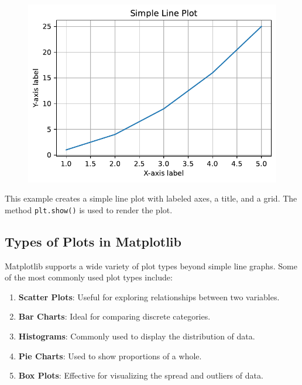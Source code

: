\documentclass[
  letterpaper,
  DIV=11,
  numbers=noendperiod]{scrreprt}
\providecommand{\tightlist}{%
  \setlength{\itemsep}{0pt}\setlength{\parskip}{0pt}}\usepackage{longtable,booktabs,array}
\begin{document}
\begin{figure}[H]

{\centering \includegraphics{15_Data_Vis_files/figure-pdf/cell-3-output-1.pdf}

}

\end{figure}

This example creates a simple line plot with labeled axes, a title, and
a grid. The method \texttt{plt.show()} is used to render the plot.

\hypertarget{types-of-plots-in-matplotlib}{%
\subsection{Types of Plots in
Matplotlib}\label{types-of-plots-in-matplotlib}}

Matplotlib supports a wide variety of plot types beyond simple line
graphs. Some of the most commonly used plot types include:

\begin{enumerate}
\def\labelenumi{\arabic{enumi}.}
\tightlist
\item
  \textbf{Scatter Plots}: Useful for exploring relationships between two
  variables.
\item
  \textbf{Bar Charts}: Ideal for comparing discrete categories.
\item
  \textbf{Histograms}: Commonly used to display the distribution of
  data.
\item
  \textbf{Pie Charts}: Used to show proportions of a whole.
\item
  \textbf{Box Plots}: Effective for visualizing the spread and outliers
  of data.
\end{enumerate}
\end{document}
